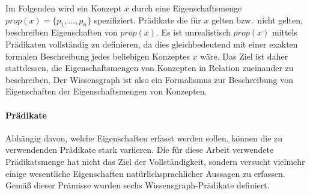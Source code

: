 Im Folgenden wird ein Konzept $x$ durch eine Eigenschaftsmenge $prop(x) = \{ p_1, \dots, p_n \}$ spezifiziert.
Prädikate die für $x$ gelten bzw.\ nicht gelten, beschreiben Eigenschaften von $prop(x)$.
Es ist unrealistisch $prop(x)$ mittels Prädikaten vollständig zu definieren, da dies gleichbedeutend mit einer exakten formalen Beschreibung jedes beliebigen Konzeptes $x$ wäre.
Das Ziel ist daher stattdessen, die Eigenschaftsmengen von Konzepten in Relation zueinander zu beschreiben.
Der Wissensgraph ist also ein Formalismus zur Beschreibung von Eigenschaften der Eigenschaftsmengen von Konzepten.

\paragraph{Prädikate}
Abhängig davon, welche Eigenschaften erfasst werden sollen, können die zu verwendenden Prädikate stark variieren.
Die für diese Arbeit verwendete Prädikatsmenge hat nicht das Ziel der Vollständigkeit, sondern versucht vielmehr einige wesentliche Eigenschaften natürlichsprachlicher Aussagen zu erfassen.
Gemäß dieser Prämisse wurden sechs Wissensgraph-Prädikate definiert.
